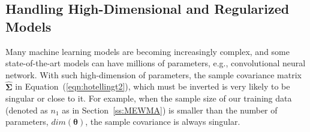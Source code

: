 \documentclass[twoside,11pt]{article}
\begin{document}



\subsection{Handling High-Dimensional and Regularized Models}
\label{ss:high_dim_score}
Many machine learning models are becoming increasingly complex, and some state-of-the-art models can have millions of parameters, e.g., convolutional neural network. With such high-dimension of parameters, the sample covariance matrix $\hat{\bm{\Sigma}}$ in Equation~(\ref{eqn:hotellingt2}), which must be inverted is very likely to be singular or close to it. For example, when the sample size of our training data (denoted as $n_1$ as in Section~\ref{ss:MEWMA}) is smaller than the number of parameters, $dim(\bm { \theta})$, the sample covariance is always singular. 
\end{document}
